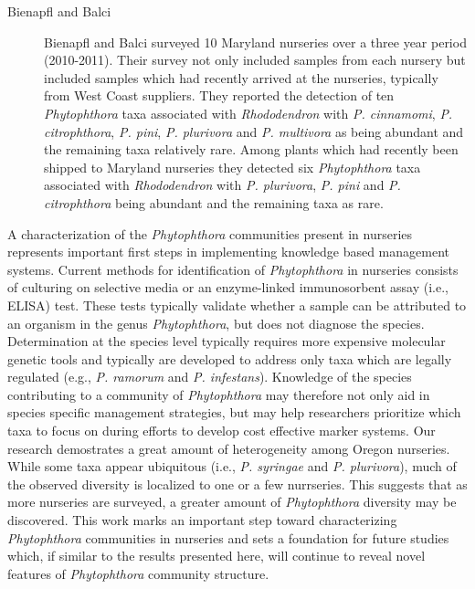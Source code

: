 \documentclass[12pt]{article}
\begin{document}
\begin{description}
  \item[Bienapfl and Balci] Bienapfl and Balci \cite{bienapfl_balci_2013} surveyed 10 Maryland nurseries over a three year period (2010-2011).  Their survey not only included samples from each nursery but included samples which had recently arrived at the nurseries, typically from West Coast suppliers.  They reported the detection of ten \emph{Phytophthora} taxa associated with \emph{Rhododendron} with \emph{P. cinnamomi}, \emph{P. citrophthora}, \emph{P. pini}, \emph{P. plurivora} and \emph{P. multivora} as being abundant and the remaining taxa relatively rare.  Among plants which had recently been shipped to Maryland nurseries they detected six \emph{Phytophthora} taxa associated with \emph{Rhododendron} with \emph{P. plurivora}, \emph{P. pini} and \emph{P. citrophthora} being abundant and the remaining taxa as rare.

\end{description}







A characterization of the \emph{Phytophthora} communities present in nurseries represents important first steps in implementing knowledge based management systems.  Current methods for identification of \emph{Phytophthora} in nurseries consists of culturing on selective media \cite{jeffers_martin_1986} or an enzyme-linked immunosorbent assay (i.e., ELISA) test.  These tests typically validate whether a sample can be attributed to an organism in the genus \emph{Phytophthora}, but does not diagnose the species.  Determination at the species level typically requires more expensive molecular genetic tools \cite{grunwald_etal_2011} and typically are developed to address only taxa which are legally regulated (e.g., \emph{P. ramorum} and \emph{P. infestans}).  Knowledge of the species contributing to a community of \emph{Phytophthora} may therefore not only aid in species specific management strategies, but may help researchers prioritize which taxa to focus on during efforts to develop cost effective marker systems.  Our research demostrates a great amount of heterogeneity among Oregon nurseries.  While some taxa appear ubiquitous (i.e., \emph{P. syringae} and \emph{P. plurivora}), much of the observed diversity is localized to one or a few nurrseries.  This suggests that as more nurseries are surveyed, a greater amount of \emph{Phytophthora} diversity may be discovered.  This work marks an important step toward characterizing \emph{Phytophthora} communities in nurseries and sets a foundation for future studies which, if similar to the results presented here, will continue to reveal novel features of \emph{Phytophthora} community structure.
\end{document}
